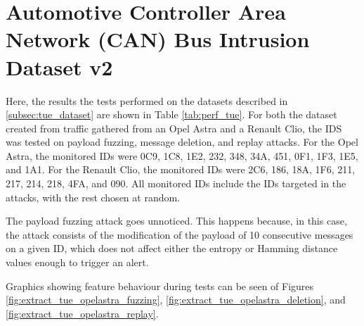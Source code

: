\section{Automotive Controller Area Network (CAN) Bus Intrusion Dataset v2}

Here, the results the tests performed on the datasets described in \ref{subsec:tue_dataset} are shown in Table \ref{tab:perf_tue}. For both the dataset created from traffic gathered from an Opel Astra and a Renault Clio, the IDS was tested on payload fuzzing, message deletion, and replay attacks. For the Opel Astra, the monitored IDs were 0C9, 1C8, 1E2, 232, 348, 34A, 451, 0F1, 1F3, 1E5, and 1A1. For the Renault Clio, the monitored IDs were 2C6, 186, 18A, 1F6, 211, 217, 214, 218, 4FA, and 090. All monitored IDs include the IDs targeted in the attacks, with the rest chosen at random.\par
The payload fuzzing attack goes unnoticed. This happens because, in this case, the attack consists of the modification of the payload of 10 consecutive messages on a given ID, which does not affect either the entropy or Hamming distance values enough to trigger an alert.\par
Graphics showing feature behaviour during tests can be seen of Figures \ref{fig:extract_tue_opelastra_fuzzing}, \ref{fig:extract_tue_opelastra_deletion}, and \ref{fig:extract_tue_opelastra_replay}.

